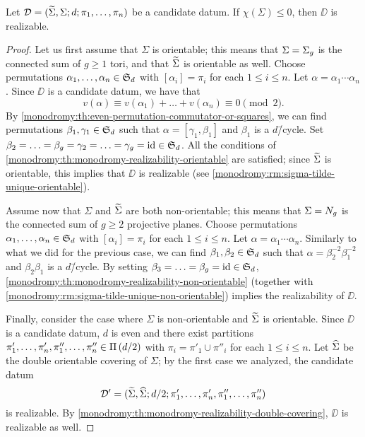 \begin{theorem}
Let $\mathcal{D}=(\widetilde{\Sigma},\Sigma;d;\pi_1,\ldots,\pi_n)$ be a candidate datum. If $\chi(\Sigma)\le 0$, then $\DD$ is realizable.
\end{theorem}
\begin{proof}
Let us first assume that $\Sigma$ is orientable; this means that $\Sigma=\Sigma_{g}$ is the connected sum of $g\ge 1$ tori, and that $\widetilde{\Sigma}$ is orientable as well. Choose permutations $\alpha_1,\ldots,\alpha_n\in\symgroup[d]$ with $[\alpha_i]=\pi_i$ for each $1\le i\le n$. Let $\alpha=\alpha_1\cdots\alpha_n$. Since $\DD$ is a candidate datum, we have that
\[
v(\alpha)\equiv v(\alpha_1)+\ldots+v(\alpha_n)\equiv 0\pmod{2}.
\]
By \cref{monodromy:th:even-permutation-commutator-or-squares}, we can find permutations $\beta_1,\gamma_1\in\symgroup[d]$ such that $\alpha=[\gamma_1,\beta_1]$ and $\beta_1$ is a $d$\=/cycle. Set $\beta_2=\ldots=\beta_g=\gamma_2=\ldots=\gamma_g=\id\in\symgroup[d]$. All the conditions of \cref{monodromy:th:monodromy-realizability-orientable} are satisfied; since $\widetilde{\Sigma}$ is orientable, this implies that $\DD$ is realizable (see \cref{monodromy:rm:sigma-tilde-unique-orientable}).

Assume now that $\Sigma$ and $\widetilde{\Sigma}$ are both non-orientable; this means that $\Sigma=N_{g}$ is the connected sum of $g\ge 2$ projective planes. Choose permutations $\alpha_1,\ldots,\alpha_n\in\symgroup[d]$ with $[\alpha_i]=\pi_i$ for each $1\le i\le n$. Let $\alpha=\alpha_1\cdots\alpha_n$. Similarly to what we did for the previous case, we can find $\beta_1,\beta_2\in\symgroup[d]$ such that $\alpha=\beta_2^{-2}\beta_1^{-2}$ and $\beta_2\beta_1$ is a $d$\=/cycle. By setting $\beta_3=\ldots=\beta_g=\id\in\symgroup[d]$, \cref{monodromy:th:monodromy-realizability-non-orientable} (together with \cref{monodromy:rm:sigma-tilde-unique-non-orientable}) implies the realizability of $\DD$.

Finally, consider the case where $\Sigma$ is non-orientable and $\widetilde{\Sigma}$ is orientable. Since $\DD$ is a candidate datum, $d$ is even and there exist partitions $\pi'_1,\ldots,\pi'_n,\pi''_1,\ldots,\pi''_n\in\Pi\left(d/2\right)$ with $\pi_i=\pi'_1\cup\pi''_i$ for each $1\le i\le n$. Let $\widehat{\Sigma}$ be the double orientable covering of $\Sigma$; by the first case we analyzed, the candidate datum
\[
\mathcal{D}'=(\widetilde{\Sigma},\widehat{\Sigma};d/2;\pi'_1,\ldots,\pi'_n,\pi''_1,\ldots,\pi''_n)
\]
is realizable. By \cref{monodromy:th:monodromy-realizability-double-covering}, $\DD$ is realizable as well.
\end{proof}

